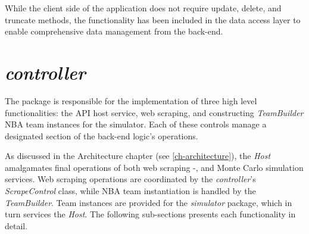 \documentclass{thesis-ekf}
\theoremstyle{definition}
\theoremstyle{remark}
\begin{document}
While the client side of the application does not require update, delete, and truncate methods, the functionality has been included in the data access layer to enable comprehensive data management from the back-end.

\section{\emph{controller}}
The package is responsible for the implementation of three high level functionalities: the API host service, web scraping, and constructing \emph{TeamBuilder} NBA team instances for the simulator. Each of these controls manage a designated section of the back-end logic's operations. 

As discussed in the Architecture chapter (see \ref{ch-architecture}), the \emph{Host} amalgamates final operations of both web scraping -, and Monte Carlo simulation services. Web scraping operations are coordinated by the \emph{controller}'s \emph{ScrapeControl} class, while NBA team instantiation is handled by the \emph{TeamBuilder}. Team instances are provided for the \emph{simulator} package, which in turn services the \emph{Host}. The following sub-sections presents each functionality in detail.
\end{document}
